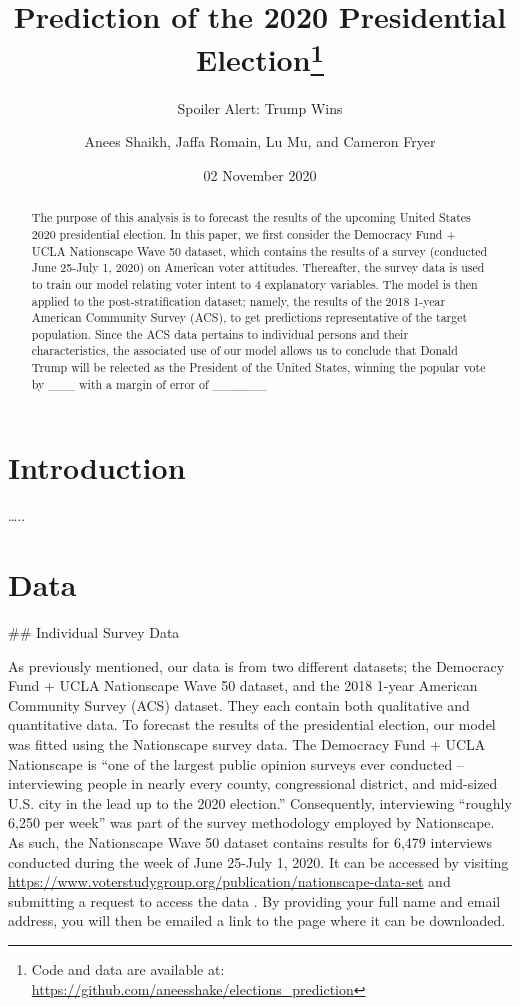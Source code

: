 \documentclass[
]{article}
\title{Prediction of the 2020 Presidential Election\thanks{Code and data are available at: \url{https://github.com/aneesshake/elections_prediction}}}
\subtitle{Spoiler Alert: Trump Wins}
\author{Anees Shaikh, Jaffa Romain, Lu Mu, and Cameron Fryer}
\date{02 November 2020}
\begin{document}
\maketitle
\begin{abstract}
The purpose of this analysis is to forecast the results of the upcoming United States 2020 presidential election. In this paper, we first consider the Democracy Fund + UCLA Nationscape Wave 50 dataset, which contains the results of a survey (conducted June 25-July 1, 2020) on American voter attitudes. Thereafter, the survey data is used to train our model relating voter intent to 4 explanatory variables. The model is then applied to the post-stratification dataset; namely, the results of the 2018 1-year American Community Survey (ACS), to get predictions representative of the target population. Since the ACS data pertains to individual persons and their characteristics, the associated use of our model allows us to conclude that Donald Trump will be relected as the President of the United States, winning the popular vote by \_\_\_ with a margin of error of \_\_\_\_\_\_
\end{abstract}

\hypertarget{introduction}{%
\section{Introduction}\label{introduction}}

\ldots..

\hypertarget{data}{%
\section{Data}\label{data}}

\#\# Individual Survey Data

As previously mentioned, our data is from two different datasets; the Democracy Fund + UCLA Nationscape Wave 50 dataset, and the 2018 1-year American Community Survey (ACS) dataset. They each contain both qualitative and quantitative data.
To forecast the results of the presidential election, our model was fitted using the Nationscape survey data. The Democracy Fund + UCLA Nationscape is ``one of the largest public opinion surveys ever conducted -- interviewing people in nearly every county, congressional district, and mid-sized U.S. city in the lead up to the 2020 election.'' \cite{vavreck_tausanovitch_2020} Consequently, interviewing ``roughly 6,250 per week'' was part of the survey methodology employed by Nationscape. As such, the Nationscape Wave 50 dataset contains results for 6,479 interviews conducted during the week of June 25-July 1, 2020. It can be accessed by visiting \url{https://www.voterstudygroup.org/publication/nationscape-data-set} and submitting a request to access the data \cite{vavreck_tausanovitch_2020}. By providing your full name and email address, you will then be emailed a link to the page where it can be downloaded.
\end{document}
